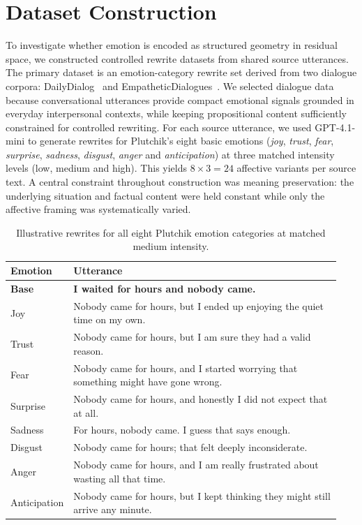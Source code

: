 \section{Dataset Construction}\label{sec:dataset_construction}

To investigate whether emotion is encoded as structured geometry in residual space, we constructed controlled rewrite datasets from shared source utterances. The primary dataset is an emotion-category rewrite set derived from two dialogue corpora: DailyDialog~\cite{li2017dailydialogmanuallylabelledmultiturn} and EmpatheticDialogues~\cite{rashkin2019empatheticopendomainconversationmodels}. We selected dialogue data because conversational utterances provide compact emotional signals grounded in everyday interpersonal contexts, while keeping propositional content sufficiently constrained for controlled rewriting. For each source utterance, we used GPT-4.1-mini to generate rewrites for Plutchik's eight basic emotions (\textit{joy}, \textit{trust}, \textit{fear}, \textit{surprise}, \textit{sadness}, \textit{disgust}, \textit{anger} and \textit{anticipation}) at three matched intensity levels (low, medium and high). This yields $8\times3 = 24$ affective variants per source text. A central constraint throughout construction was meaning preservation: the underlying situation and factual content were held constant while only the affective framing was systematically varied.

\begin{table}[H]
\centering
\small
\begin{tabular}{p{0.12\linewidth} p{0.82\linewidth}}
\toprule
\textbf{Emotion} & \textbf{Utterance} \\
\midrule
\textbf{Base} & \textbf{I waited for hours and nobody came.} \\
Joy & Nobody came for hours, but I ended up enjoying the quiet time on my own. \\
Trust & Nobody came for hours, but I am sure they had a valid reason. \\
Fear & Nobody came for hours, and I started worrying that something might have gone wrong. \\
Surprise & Nobody came for hours, and honestly I did not expect that at all. \\
Sadness & For hours, nobody came. I guess that says enough. \\
Disgust & Nobody came for hours; that felt deeply inconsiderate. \\
Anger & Nobody came for hours, and I am really frustrated about wasting all that time. \\
Anticipation & Nobody came for hours, but I kept thinking they might still arrive any minute. \\
\bottomrule
\end{tabular}
\caption{Illustrative rewrites for all eight Plutchik emotion categories at matched medium intensity.}
\label{tab:emotion_rewrite_example}
\end{table}

